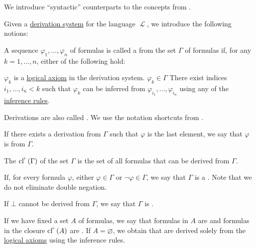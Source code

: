 \begin{definition}\label{def:first_order_proofs}
  We introduce \enquote{syntactic} counterparts to the concepts from .

  Given a \hyperref[def:first_order_derivation_system]{derivation system} for the language \( \mscrL \), we introduce the following notions:
  \begin{thmenum}
    A sequence \( \varphi_1, \ldots, \varphi_n \) of formulas is called a  from the set \( \Gamma \) of formulas if, for any \( k = 1, \ldots, n \), either of the following hold:
    \begin{thmenum}
       \( \varphi_k \) is a \hyperref[def:first_order_derivation_system/axioms]{logical axiom} in the derivation system.
       \( \varphi_k \in \Gamma \)
       There exist indices \( i_1, \ldots, i_n < k \) such that \( \varphi_k \) can be inferred from \( \varphi_{i_1}, \ldots, \varphi_{i_n} \) using any of the \hyperref[def:first_order_derivation_system/rules]{inference rules}.
    \end{thmenum}

    Derivations are also called . We use the notation shortcuts from .

     If there exists a derivation from \( \Gamma \) such that \( \varphi \) is the last element, we say that \( \varphi \) is  from \( \Gamma \).

     The  \( \operatorname{cl}^{\vdash}(\Gamma) \) of the set \( \Gamma \) is the set of all formulas that can be derived from \( \Gamma \).

    If, for every formula \( \varphi \), either \( \varphi \in \Gamma \) or \( \neg \varphi \in \Gamma \), we say that \( \Gamma \) is a . Note that we do not eliminate double negation.

    If \( \bot \) cannot be derived from \( \Gamma \), we say that \( \Gamma \) is .

     If we have fixed a set \( A \) of formulas, we say that formulas in \( A \) are  and formulas in the closure \( \operatorname{cl}^{\vdash}(A) \) are . If \( A = \varnothing \), we obtain  that are derived solely from the \hyperref[def:first_order_derivation_system/axioms]{logical axioms} using the inference rules.
  \end{thmenum}
\end{definition}

